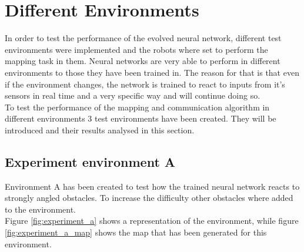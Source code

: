 \section{Different Environments}
In order to test the performance of the evolved neural network, different test environments were implemented and the robots where set to perform the mapping task in them. 
Neural networks are very able to perform in different environments to those they have been trained in. The reason for that is that even if the environment changes, the network is trained to react to inputs from it's sensors in real time and a very specific way and will continue doing so. \\
To test the performance of the mapping and communication algorithm in different environments 3 test environments have been created. They will be introduced and their results analysed in this section.\\

\subsection{Experiment environment A}
Environment A has been created to test how the trained neural network reacts to strongly angled obstacles. To increase the difficulty other obstacles where added to the environment.\\
Figure \ref{fig:experiment_a} shows a representation of the environment, while figure \ref{fig:experiment_a_map} shows the map that has been generated for this environment.  

